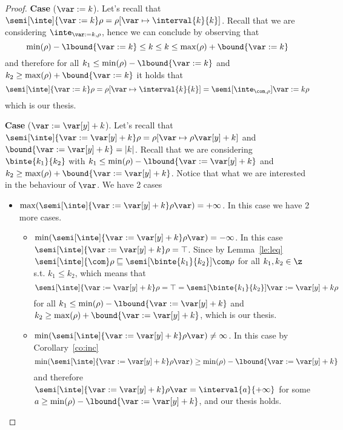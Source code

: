 \begin{proof}
  \medskip
  
  \noindent
  \textbf{Case} (\(\var := k\)).
  Let's recall that
  \({\semi[\inte]{\var := k}\rho = \rho[\var \mapsto \interval{k}{k}
    ]}\). Recall that we are considering \(\inte_{\var := k,\rho}\),
  hence we can conclude by observing that
  \begin{equation*}
    \min(\rho) - \lbound{\var := k} \leq k \leq k \leq \max(\rho) + \bound{\var := k}
  \end{equation*}
  and therefore for all \(k_1 \leq \min(\rho) - \lbound{\var:=k}\) and
  \(k_2 \geq \max(\rho) + \bound{\var := k}\) it holds that
  \begin{equation*}
    \semi[\inte]{\var := k}\rho = \rho[\var \mapsto \interval{k}{k}] = \semi[\inte_{\com,\rho}]{\var := k}\rho
  \end{equation*}
  which is our thesis.

  \medskip
  
  \noindent
  \textbf{Case} (\(\var := \var[y] + k\)).
  Let's recall that
  \({\semi[\inte]{\var := \var[y] + k}\rho = \rho[\var \mapsto
    \rho\var[y] + k]}\) and \(\bound{\var := \var[y] + k} =
  |k|\). Recall that we are considering \(\binte{k_1}{k_2}\) with
  \(k_1 \leq \min(\rho) - \lbound{\var := \var[y] + k}\) and
  \(k_2 \geq \max(\rho) + \bound{\var := \var[y] + k}\). Notice that
  what we are interested in the behaviour of \(\var\). We have 2 cases
  \begin{itemize}
  \item
    \({\max(\semi[\inte]{\var := \var[y] + k}\rho\var)} =
    +\infty\). In this case we have 2 more cases.
    \begin{itemize}
    \item
      \({\min(\semi[\inte]{\var := \var[y] + k}\rho\var)} =
      -\infty\). In this case
      \({\semi[\inte]{\var := \var[y] + k}\rho} = \top\). Since by
      Lemma~\ref{le:leq}
      \(\semi[\inte]{\com}\rho \sqsubseteq
      \semi[\binte{k_1}{k_2}]{\com}\rho\) for all \(k_1, k_2 \in \z\)
      s.t. \(k_1 \leq k_2\), which means that
      \begin{equation*}
        \semi[\inte]{\var := \var[y] + k}\rho = \top = \semi[\binte{k_1}{k_2}]{\var := \var[y] + k}\rho
      \end{equation*}
      for all \(k_1 \leq \min(\rho) - \lbound{\var := \var[y] + k}\)
      and \(k_2 \geq \max(\rho) + \bound{\var := \var[y] + k}\), which
      is our thesis.
    \item
      \({\min(\semi[\inte]{\var := \var[y] + k}\rho\var)} \neq
      \infty\). In this case by Corollary~\ref{co:inc}
      \begin{equation*}
        \min(\semi[\inte]{\var := \var[y] + k}\rho\var) \geq \min(\rho) - \lbound{\var := \var[y] + k}
      \end{equation*}
      and therefore
      \({\semi[\inte]{\var := \var[y] + k}\rho\var} =
      \interval{a}{+\infty}\) for some
      \(a \geq \min(\rho) - \lbound{\var := \var[y] + k}\), and our
      thesis holds.


\end{itemize}
\end{itemize}
\end{proof}

